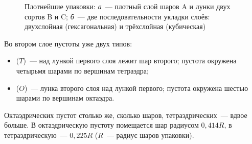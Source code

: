 \begin{figure}[ht]
\centering
\begin{subfigure}[b]{0.5\textwidth}\centering
{}
\caption{}
\end{subfigure}\hfill
\begin{subfigure}[b]{0.46\textwidth}\centering
{}
\caption{}
\end{subfigure}
\caption{Плотнейшие упаковки: \textit{а}~— плотный слой шаров A и лунки
двух сортов B и C; \textit{б}~— две последовательности укладки слоёв:
двухслойная (гексагональная) и трёхслойная (кубическая)}
\label{fig:cp-layer}
\end{figure}

Во втором слое пустоты уже двух типов:
\begin{itemize}
\item {} ($T$)~— над лункой первого слоя лежит шар
второго; пустота окружена четырьмя шарами по вершинам тетраэдра;
\item {} ($O$)~— лунка второго слоя над лункой первого;
пустота окружена шестью шарами по вершинам октаэдра.
\end{itemize}
Октаэдрических пустот столько же, сколько шаров, тетраэдрических~— вдвое
больше. В октаэдрическую пустоту помещается шар радиусом $0{,}414R$, в
тетраэдрическую~— $0{,}225R$ ($R$~— радиус шаров упаковки).

